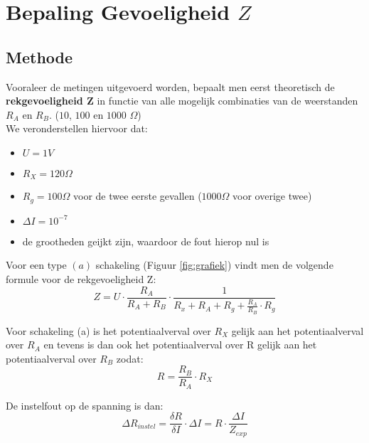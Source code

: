 \section{Bepaling Gevoeligheid $Z$}
\subsection{Methode}

Vooraleer de metingen uitgevoerd worden, bepaalt men eerst theoretisch
de \textbf{rekgevoeligheid Z} in functie van alle mogelijk combinaties van de 
weerstanden $R_{A}$ en $R_{B}$. ($10$, $100$ en $1000$ $\Omega$) 
\\

We veronderstellen hiervoor dat:

\begin{itemize}
    \item $U = 1 V$
    \item $R_X = 120 \Omega$
    \item $R_g = 100 \Omega$ voor de twee eerste gevallen ($1000 \Omega$ voor overige twee)
    \item $\Delta I = 10^{-7}$
    \item de grootheden geijkt zijn, waardoor de fout hierop nul is
\end{itemize}

Voor een type $(a)$ schakeling (Figuur \ref{fig:grafiek}) vindt men de volgende formule voor de rekgevoeligheid Z:
\\

\begin{equation}
    Z = U \cdot \frac{R_A}{R_A + R_B} \cdot \frac{1}{R_x + R_A + R_g + \frac{R_A}{R_B}\cdot R_g}
\end{equation}

Voor schakeling (a) is het potentiaalverval over $R_X$ gelijk aan het potentiaalverval over $R_A$
en tevens is dan ook het potentiaalverval over R gelijk aan het potentiaalverval over $R_B$ zodat:
\\

\begin{equation}
   R = \frac{R_B}{R_A} \cdot R_X 
\end{equation}

De instelfout op de spanning is dan:
\\

\begin{equation}
    \Delta R_{instel} = \frac{\delta R}{\delta I} \cdot \Delta I = R \cdot \frac{\Delta I}{Z_{exp}}
\end{equation}

